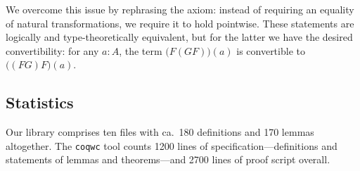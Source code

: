 We overcome this issue by rephrasing the axiom: instead of requiring an equality of natural 
transformations, we require it to hold pointwise. 
These statements are logically and type-theoretically equivalent, but for the latter we have the
desired convertibility: for any $a : A$, the term $\big(F(GF)\big)(a)$ is convertible to $\big((FG)F\big)(a)$.



\subsection*{Statistics}

Our library comprises ten files with ca.\ 180 definitions and 170 lemmas altogether.
The \texttt{coqwc} tool counts 1200 lines of specification---definitions and statements of lemmas and theorems---and 
2700 lines of proof script overall.




